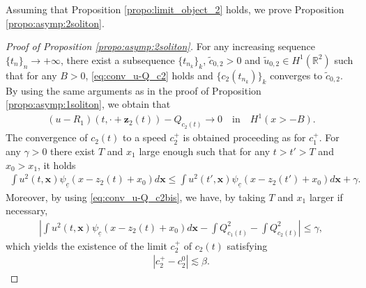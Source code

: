 \documentclass[reqno,10pt]{amsart}
\numberwithin{equation}{section}
\newcommand{\bx}{\mathbf{x}}
\newcommand{\bz}{\mathbf{z}}
\begin{document}
	Assuming that Proposition \ref{propo:limit_object_2} holds, we prove Proposition \ref{propo:asymp:2soliton}.
 
 \begin{proof}[Proof of Proposition \ref{propo:asymp:2soliton}]

 For any increasing sequence $\{t_n\}_n \rightarrow +\infty$, there exist a subsequence $\{t_{n_k}\}_k$, $\tilde{c}_{0,2} >0$ and $\tilde{u}_{0,2} \in H^1(\mathbb R^2)$ such that for any $B>0$, \eqref{eq:conv_u-Q_c2} holds and $\{c_2(t_{n_k})\}_k$ converges to $\tilde{c}_{0,2}$. By using the same arguments as in the proof of Proposition \ref{propo:asymp:1soliton}, we obtain that
	\begin{align}\label{eq:conv_u-Q_c2bis}
	\left( u - R_1 \right) (t, \cdot + \bz_2(t)) - Q_{c_2(t)} \rightarrow 0 \quad \text{in} \quad H^1(x>-B).
	\end{align}
	The convergence of $c_2(t)$ to a speed $c_2^+$ is obtained proceeding as for $c_1^+$. For any $\gamma>0$ there exist $T$ and $x_1$ large enough such that for any $t>t'>T$ and $x_0>x_1$, it holds
	\begin{align*}
		\int u^2(t,\bx) \psi_{\underline{c}} \left( x- z_2(t) +x_0 \right) d \bx \leq \int u^2(t',\bx) \psi_{\underline{c}}(x -z_2(t')+x_0) d\bx + \gamma.
	\end{align*}
 Moreover, by using \eqref{eq:conv_u-Q_c2bis}, we have, by taking $T$ and $x_1$ larger if necessary,
\begin{align*}
	\left\vert \int u^2(t,\bx) \psi_{\underline{c}} \left( x-z_2(t)+x_0 \right) d\bx - \int Q_{c_1(t)}^2 - \int Q^2_{c_2(t)} \right\vert \leq \gamma,
\end{align*}
which yields the existence of the limit $c_2^+$ of $c_2(t)$ satisfying
\begin{align*}
	\left\vert c_2^+ -c_2^0 \right\vert \lesssim \beta.
\end{align*}
 \end{proof}
\end{document}
